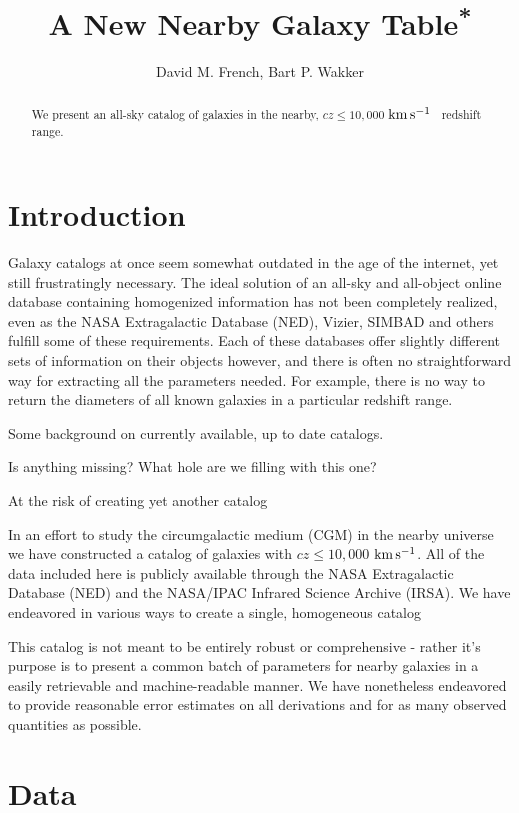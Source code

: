 \documentclass[iop]{emulateapj-rtx4}
\newcommand{\kms}{$\rm km\, s^{-1}$}
\begin{document}
\title{A New Nearby Galaxy Table\textsuperscript{*}}

\author{David M. French, Bart P. Wakker}



\begin{abstract}

We present an all-sky catalog of galaxies in the nearby, $cz \leq 10,000$ \kms~ redshift range. 

\end{abstract}


\section{Introduction}
Galaxy catalogs at once seem somewhat outdated in the age of the internet, yet still frustratingly necessary. The ideal solution of an all-sky and all-object online database containing homogenized information has not been completely realized, even as the NASA Extragalactic Database (NED), Vizier, SIMBAD and others fulfill some of these requirements. Each of these databases offer slightly different sets of information on their objects however, and there is often no straightforward way for extracting all the parameters needed. For example, there is no way to return the diameters of all known galaxies in a particular redshift range.


Some background on currently available, up to date catalogs.

Is anything missing? What hole are we filling with this one?

At the risk of creating yet another catalog 

In an effort to study the circumgalactic medium (CGM) in the nearby universe we have constructed a catalog of galaxies with $cz \leq 10,000$ \kms. All of the data included here is publicly available through the NASA Extragalactic Database (NED) and the NASA/IPAC Infrared Science Archive (IRSA). We have endeavored in various ways to create a single, homogeneous catalog 

This catalog is not meant to be entirely robust or comprehensive - rather it's purpose is to present a common batch of parameters for nearby galaxies in a easily retrievable and machine-readable manner. We have nonetheless endeavored to provide reasonable error estimates on all derivations and for as many observed quantities as possible.


\section{Data}
\end{document}
